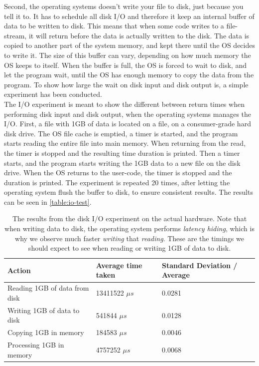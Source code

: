 \documentclass[a4paper]{article}
\begin{document}
Second, the operating systems doesn't write your file to disk, just because you tell it to. It has to schedule all disk I/O and therefore it keep an internal buffer of data to be written to disk. This means that when some code writes to a file-stream, it will return before the data is actually written to the disk. The data is copied to another part of the system memory, and kept there until the OS decides to write it. The size of this buffer can vary, depending on how much memory the OS keeps to itself. When the buffer is full, the OS is forced to wait to disk, and let the program wait, until the OS has enough memory to copy the data from the program. To show how large the wait on disk input and disk output is, a simple experiment has been conducted.\\

The I/O experiment is meant to show the different between return times when performing disk input and disk output, when the operating systems manages the I/O. First, a file with 1GB of data is located on a file, on a consumer-grade hard disk drive. The OS file cache is emptied, a timer is started, and the program starts reading the entire file into main memory. When returning from the read, the timer is stopped and the resulting time duration is printed. Then a timer starts, and the program starts writing the 1GB data to a new file on the disk drive. When the OS returns to the user-code, the timer is stopped and the duration is printed. The experiment is repeated 20 times, after letting the operating system flush the buffer to disk, to ensure consistent results. The results can be seen in \autoref{table:io-test}.\\

\begin{table}[]
\begin{adjustwidth}{-0.5in}{-0.5in}
\centering
\begin{tabular}{@{}lll@{}}
\toprule
\textbf{Action}                & \textbf{Average time taken}               & \textbf{Standard Deviation / Average} \\ \midrule
Reading 1GB of data from disk  & 13411522 $\mu s$                          & 0.0281                                \\ \midrule
Writing 1GB of data to disk    & 541844   $\mu s$                          & 0.0128                                \\ \midrule
Copying 1GB in memory          & 184583   $\mu s$                          & 0.0046                                \\ \midrule
Processing 1GB in memory       & 4757252  $\mu s$                          & 0.0068                                \\ \bottomrule
\end{tabular}
\caption{The results from the disk I/O experiment on the actual hardware. Note that when writing data to disk, the operating system performs \textit{latency hiding}, which is why we observe much faster \textit{writing} that \textit{reading}. These are the timings we should expect to see when reading or writing 1GB of data to disk.}
\label{table:io-test}
\end{adjustwidth}
\end{table}
\end{document}
